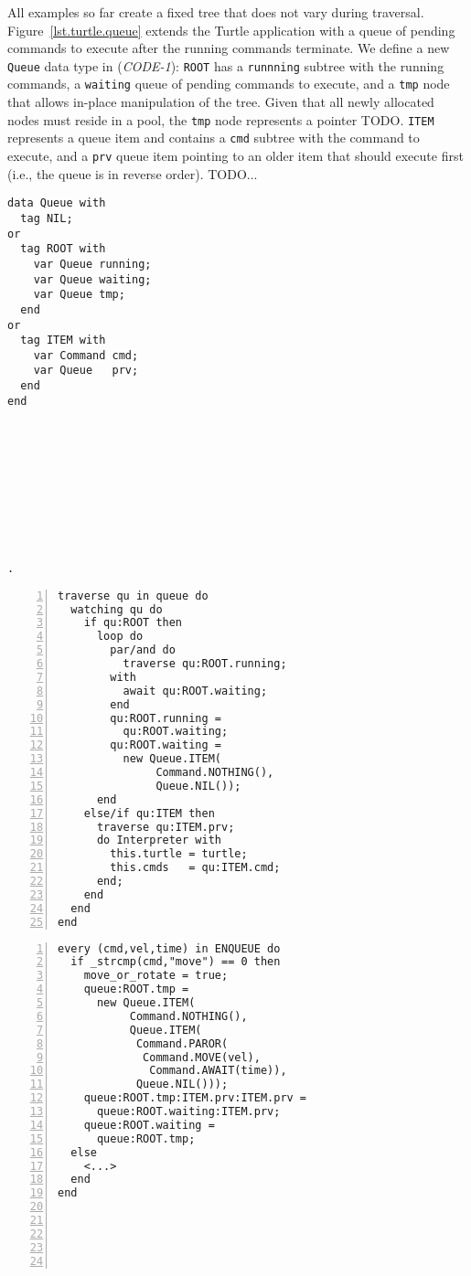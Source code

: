 \documentclass{acm_proc_article-sp}
\newcommand{\code}[1] {{\small{\texttt{#1}}}}
\begin{document}
All examples so far create a fixed tree that does not vary during traversal.
%
Figure~\ref{lst.turtle.queue} extends the Turtle application with a queue of 
pending commands to execute after the running commands terminate.
We define a new \code{Queue} data type in (\emph{CODE-1}):
\code{ROOT} has a \code{runnning} subtree with the running commands, a 
\code{waiting} queue of pending commands to execute, and a \code{tmp} node that 
allows in-place manipulation of the tree.
Given that all newly allocated nodes must reside in a pool, the \code{tmp} node 
represents a pointer TODO.
\code{ITEM} represents a queue item and contains a \code{cmd} subtree with the 
command to execute, and a \code{prv} queue item pointing to an older item that 
should execute first (i.e., the queue is in reverse order).
%
TODO...

\begin{figure*}%
\begin{minipage}[t]{0.20\linewidth}
\begin{lstlisting}[title=CODE-1: The \code{Queue} data type]
data Queue with
  tag NIL;
or
  tag ROOT with
    var Queue running;
    var Queue waiting;
    var Queue tmp;
  end
or
  tag ITEM with
    var Command cmd;
    var Queue   prv;
  end
end










.
\end{lstlisting}
\end{minipage}
%
\begin{minipage}[t]{0.36\linewidth}
\begin{lstlisting}[numbers=left,xleftmargin=3.5em,title=CODE-2: Queue traversal]
traverse qu in queue do
  watching qu do
    if qu:ROOT then
      loop do
        par/and do
          traverse qu:ROOT.running;
        with
          await qu:ROOT.waiting;
        end
        qu:ROOT.running =
          qu:ROOT.waiting;
        qu:ROOT.waiting =
          new Queue.ITEM(
               Command.NOTHING(),
               Queue.NIL());
      end
    else/if qu:ITEM then
      traverse qu:ITEM.prv;
      do Interpreter with
        this.turtle = turtle;
        this.cmds   = qu:ITEM.cmd;
      end;
    end
  end
end
\end{lstlisting}
\end{minipage}
%
\begin{minipage}[t]{0.38\linewidth}
\begin{lstlisting}[numbers=left,xleftmargin=3.5em,title=CODE-3: Command enqueuing]
every (cmd,vel,time) in ENQUEUE do
  if _strcmp(cmd,"move") == 0 then
    move_or_rotate = true;
    queue:ROOT.tmp =
      new Queue.ITEM(
           Command.NOTHING(),
           Queue.ITEM(
            Command.PAROR(
             Command.MOVE(vel),
              Command.AWAIT(time)),
            Queue.NIL()));
    queue:ROOT.tmp:ITEM.prv:ITEM.prv =
      queue:ROOT.waiting:ITEM.prv;
    queue:ROOT.waiting =
      queue:ROOT.tmp;
  else
    <...>
  end
end






\end{lstlisting}
\end{minipage}
\end{figure*}
\end{document}
